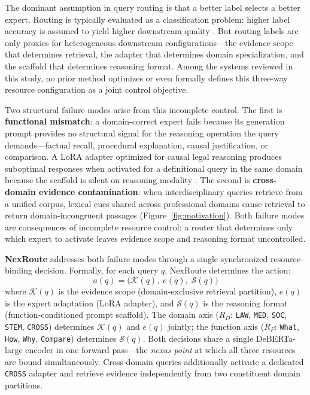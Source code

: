 \documentclass[a4paper,fleql,doubleblind]{cas-sc}
\begin{document}
The dominant assumption in query routing is that a better label selects a better expert.
Routing is typically evaluated as a classification problem: higher label accuracy is assumed to yield higher downstream quality \citep{hu2024routerbench,jeong2024adaptiverag}.
But routing labels are only proxies for heterogeneous downstream configurations---the evidence scope that determines retrieval, the adapter that determines domain specialization, and the scaffold that determines reasoning format.
Among the systems reviewed in this study, no prior method optimizes or even formally defines this three-way resource configuration as a joint control objective.

Two structural failure modes arise from this incomplete control.
The first is \textbf{functional mismatch}: a domain-correct expert fails because its generation prompt provides no structural signal for the reasoning operation the query demands---factual recall, procedural explanation, causal justification, or comparison.
A LoRA adapter optimized for causal legal reasoning produces suboptimal responses when activated for a definitional query in the same domain because the scaffold is silent on reasoning modality \citep{singhal2023large,guha2023legalbench}.
The second is \textbf{cross-domain evidence contamination}: when interdisciplinary queries retrieve from a unified corpus, lexical cues shared across professional domains cause retrieval to return domain-incongruent passages (Figure~\ref{fig:motivation}).
Both failure modes are consequences of incomplete resource control: a router that determines only which expert to activate leaves evidence scope and reasoning format uncontrolled.

\textbf{NexRoute} addresses both failure modes through a single synchronized resource-binding decision.
Formally, for each query $q$, NexRoute determines the action:
\begin{equation}
a(q) = \bigl(\mathcal{K}(q),\; e(q),\; \mathcal{S}(q)\bigr)
\label{eq:resource_tuple}
\end{equation}
where $\mathcal{K}(q)$ is the evidence scope (domain-exclusive retrieval partition), $e(q)$ is the expert adaptation (LoRA adapter), and $\mathcal{S}(q)$ is the reasoning format (function-conditioned prompt scaffold).
The domain axis ($R_D$: \texttt{LAW}, \texttt{MED}, \texttt{SOC}, \texttt{STEM}, \texttt{CROSS}) determines $\mathcal{K}(q)$ and $e(q)$ jointly; the function axis ($R_F$: \texttt{What}, \texttt{How}, \texttt{Why}, \texttt{Compare}) determines $\mathcal{S}(q)$.
Both decisions share a single DeBERTa-large encoder in one forward pass---the \emph{nexus point} at which all three resources are bound simultaneously.
Cross-domain queries additionally activate a dedicated \texttt{CROSS} adapter and retrieve evidence independently from two constituent domain partitions.
\end{document}
